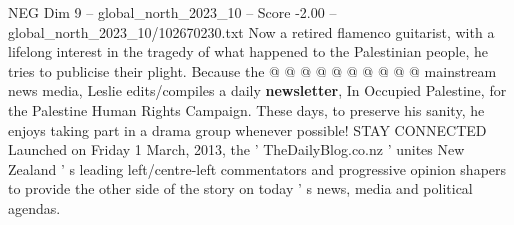 \begin{textsample}{NEG Dim 9 – global\_north\_2023\_10 – Score -2.00 – global\_north\_2023\_10/102670230.txt}
Now a retired flamenco guitarist, with a lifelong interest in the tragedy of what happened to the Palestinian people, he tries to publicise their plight.
Because the @ @ @ @ @ @ @ @ @ @ mainstream news media, Leslie edits/compiles a daily \textbf{newsletter}, In Occupied Palestine, for the Palestine Human Rights Campaign.
These days, to preserve his sanity, he enjoys taking part in a drama group whenever possible!
STAY CONNECTED Launched on Friday 1 March, 2013, the ' TheDailyBlog.co.nz ' unites New Zealand ' s leading left/centre-left commentators and progressive opinion shapers to provide the other side of the story on today ' s news, media and political agendas.

\end{textsample}
